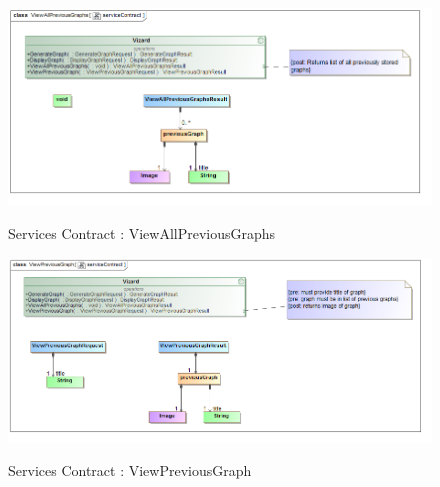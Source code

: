 \documentclass[a4paper,12pt]{article}
\begin{document}
	\begin{figure}[H]
		\includegraphics[width=\textwidth]{Images/class__ViewAllPreviousGraphs__serviceContract.png}  \\
		\caption{Services Contract : ViewAllPreviousGraphs}
	\end{figure}
	\begin{figure}[H]
		\includegraphics[width=\textwidth]{Images/class__ViewPreviousGraph__serviceContract.png}  \\
		\caption{Services Contract : ViewPreviousGraph}
	\end{figure}
\end{document}
